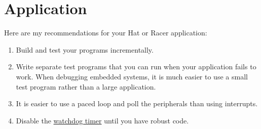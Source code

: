 \chapter{Application}


Here are my recommendations for your Hat or Racer application:
%
\begin{enumerate}
\item Build and test your programs incrementally.

\item Write separate test programs that you can run when your
  application fails to work.  When debugging embedded systems, it is
  much easier to use a small test program rather than a large
  application.

\item It is easier to use a paced loop and poll the peripherals than
  using interrupts.

\item Disable the \hyperref[watchdog-timer]{watchdog timer} until you
  have robust code.
  
\end{enumerate}

